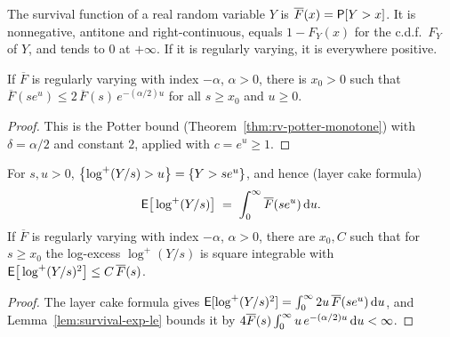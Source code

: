 \begin{definition}
  \label{def:survival}
  \leanok
  The survival function of a real random variable $Y$ is $\overline{F}(x) = \mathsf{P}[Y > x]$. It is
  nonnegative, antitone and right-continuous, equals $1 - F_Y(x)$ for the c.d.f.\ $F_Y$ of $Y$,
  and tends to $0$ at $+\infty$. If it is regularly varying, it is everywhere positive.
\end{definition}

\begin{lemma}
  \label{lem:survival-exp-le}
  \leanok
  If $\overline{F}$ is regularly varying with index $-\alpha$, $\alpha > 0$, there is $x_0 > 0$
  such that $\overline{F}(s e^u) \le 2 \, \overline{F}(s) \, e^{-(\alpha/2) u}$ for all $s \ge x_0$
  and $u \ge 0$.
\end{lemma}
\begin{proof}
  \leanok
  This is the Potter bound (Theorem~\ref{thm:rv-potter-monotone}) with $\delta = \alpha/2$ and
  constant $2$, applied with $c = e^u \ge 1$.
\end{proof}

\begin{lemma}
  \label{lem:log-excess-moments}
  \leanok
  For $s, u > 0$, $\left\{  \log^+(Y/s) > u  \right\} = \left\{  Y > s e^u  \right\}$, and hence (layer cake formula)
  \begin{align*}
    \mathsf{E} \big[ \log^+(Y/s) \big] \; = \; \int_0^\infty \overline{F}(s e^u) \, \mathrm{d} u .
  \end{align*}
  If $\overline{F}$ is regularly varying with index $-\alpha$, $\alpha > 0$, there are $x_0, C$ such
  that for $s \ge x_0$ the log-excess $\log^+(Y/s)$ is square integrable with
  $\mathsf{E} \big[ \log^+(Y/s)^2 \big] \le C \, \overline{F}(s)$.
\end{lemma}
\begin{proof}
  \leanok
  The layer cake formula gives $\mathsf{E}[\log^+(Y/s)^2] = \int_0^\infty 2u \, \overline{F}(s e^u) \, \mathrm{d} u$,
  and Lemma~\ref{lem:survival-exp-le} bounds it by
  $4 \overline{F}(s) \int_0^\infty u \, e^{-(\alpha/2)u} \, \mathrm{d} u < \infty$.
\end{proof}


